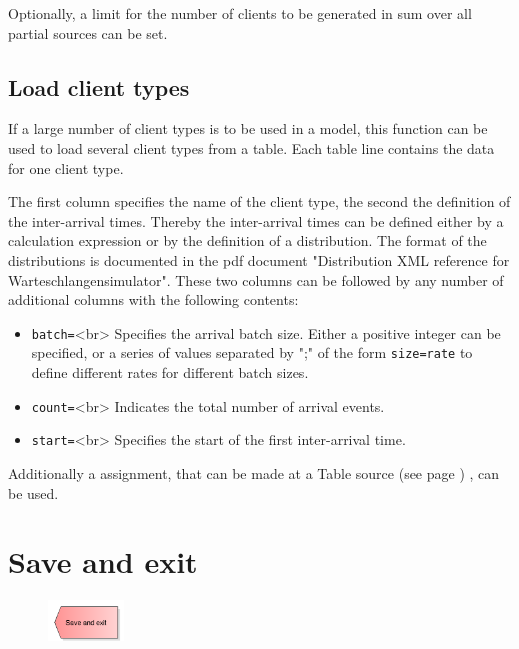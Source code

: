 Optionally, a limit for the number of clients to be generated in sum over
all partial sources can be set.

\subsection*{Load client types}

If a large number of client types is to be used in a model, this function can be used
to load several client types from a table. Each table line contains the data for one client type.

The first column specifies the name of the client type, the second the definition of the inter-arrival times.
Thereby the inter-arrival times can be defined either by a calculation expression or by the definition of a
distribution. The format of the distributions is documented in the pdf document
"Distribution XML reference for Warteschlangensimulator". These two columns can be followed by any number
of additional columns with the following contents:

\begin{itemize}
  \item \texttt{batch=}<br>
  Specifies the arrival batch size. Either a positive integer can be specified, or a series of values separated
  by ";" of the form \texttt{size=rate} to define different rates for different batch sizes. 
  \item \texttt{count=}<br>
  Indicates the total number of arrival events. 
  \item \texttt{start=}<br>
  Specifies the start of the first inter-arrival time. 
\end{itemize}

Additionally a assignment, that can be made at a Table source (see page \pageref{ref:ModelElementSourceTable}) , can be used.


\section{Save and exit}
\label{ref:ModelElementDisposeWithTable}

\begin{figure}
\vspace{-22pt}
\includegraphics[width=2cm]{imageModelElementDisposeWithTable.png}
\vspace{-22pt}
\end{figure}

